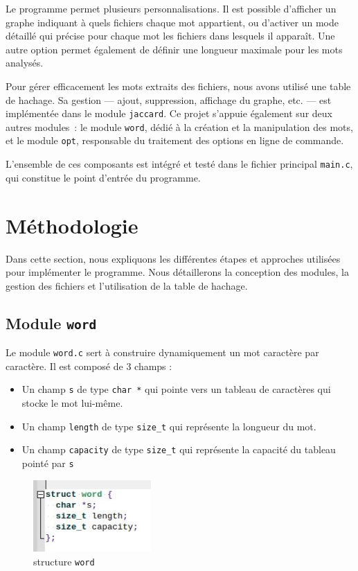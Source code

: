\documentclass{article}
\begin{document}
Le programme permet plusieurs personnalisations. Il est possible d’afficher un graphe indiquant à quels fichiers chaque mot appartient, ou d’activer un mode détaillé qui précise pour chaque mot les fichiers dans lesquels il apparaît. Une autre option permet également de définir une longueur maximale pour les mots analysés.

Pour gérer efficacement les mots extraits des fichiers, nous avons utilisé une table de hachage. Sa gestion — ajout, suppression, affichage du graphe, etc. — est implémentée dans le module \texttt{jaccard}. Ce projet s’appuie également sur deux autres modules : le module \texttt{word}, dédié à la création et la manipulation des mots, et le module \texttt{opt}, responsable du traitement des options en ligne de commande.

L’ensemble de ces composants est intégré et testé dans le fichier principal \texttt{main.c}, qui constitue le point d’entrée du programme.


\section{Méthodologie}

Dans cette section, nous expliquons les différentes étapes et approches utilisées pour implémenter le programme. Nous détaillerons la conception des modules, la gestion des fichiers et l’utilisation de la table de hachage.

\subsection{Module \texttt{word}}

Le module \texttt{word.c} sert à construire dynamiquement un mot caractère par caractère. Il est composé de 3 champs : 
\begin{itemize}
  \item Un champ \texttt{s} de type \texttt{char *} qui pointe vers un tableau de caractères qui stocke le mot lui-même.
  \item Un champ \texttt{length} de type \texttt{size\_t} qui représente la longueur du mot.
  \item Un champ \texttt{capacity} de type \texttt{size\_t} qui représente la capacité du tableau pointé par \texttt{s}
\end{itemize}

\begin{figure}[H]
    \centering
    \includegraphics[width=0.4\textwidth]{word.jpg} 
    \caption{structure \texttt{word}}
    \label{fig:structure_word}
\end{figure}
\end{document}
